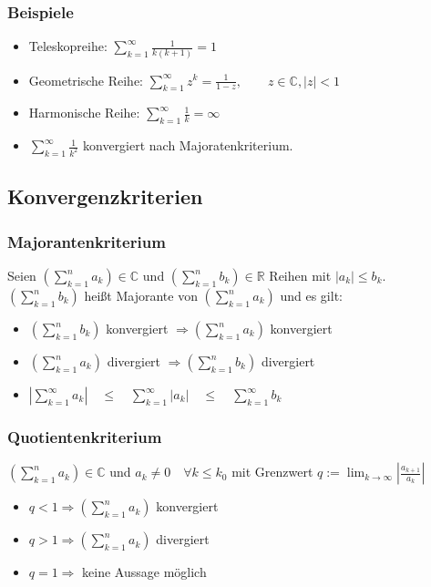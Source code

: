 \documentclass[10pt,a4paper^, twocolumn]{article}
\newcommand{\R}{\mathbb{R}}
\newcommand{\C}{\mathbb{C}}
\begin{document}
		\subsubsection{Beispiele}
			\begin{itemize}
				\item Teleskopreihe: $ \sum\limits_{k=1}^{\infty} \frac{1}{k(k+1)}  = 1$
				\item Geometrische Reihe: $ \sum\limits_{k=1}^{\infty} z^k = \frac{1}{1-z},
				\qquad z \in \C, |z| < 1 $
				\item Harmonische Reihe: $\sum\limits_{k=1}^{\infty} \frac{1}{k} = \infty $
				\item $\sum\limits_{k=1}^{\infty} \frac{1}{k^2}$ konvergiert nach 
				Majoratenkriterium.
			\end{itemize}

	\subsection{Konvergenzkriterien}
		\subsubsection{Majorantenkriterium}
			Seien $( \sum\limits_{k=1}^n a_k) \in \C$ und 
			$( \sum\limits_{k=1}^n b_k) \in \R$ Reihen mit $|a_k| \leq b_k$.\\
			$( \sum\limits_{k=1}^n b_k)$ heißt Majorante von 
			$( \sum\limits_{k=1}^n a_k)$ und es gilt:
			\begin{itemize}
				\item $( \sum\limits_{k=1}^n b_k)$ konvergiert 
				$\Rightarrow ( \sum\limits_{k=1}^n a_k)$ konvergiert
				\item $( \sum\limits_{k=1}^n a_k)$ divergiert 
				$\Rightarrow ( \sum\limits_{k=1}^n b_k)$ divergiert
				\item $\left| \sum\limits_{k=1}^{\infty} a_k \right|
					\quad \leq \quad \sum\limits_{k=1}^{\infty} |a_k| 
					\quad \leq \quad \sum\limits_{k=1}^{\infty} b_k$
			\end{itemize}
		\subsubsection{Quotientenkriterium}
			$( \sum\limits_{k=1}^n a_k) \in \C$ und $a_k \neq 0 \quad \forall k \leq k_0$
			mit Grenzwert $ q:= \lim_{k \to \infty} |\frac{a_{k+1}}{a_k}|$
			\begin{itemize}
			\item $q < 1 \Rightarrow ( \sum\limits_{k=1}^n a_k)$ konvergiert
			\item $q > 1 \Rightarrow ( \sum\limits_{k=1}^n a_k)$ divergiert
			\item $q = 1 \Rightarrow $ keine Aussage möglich 
			\end{itemize}
\end{document}
